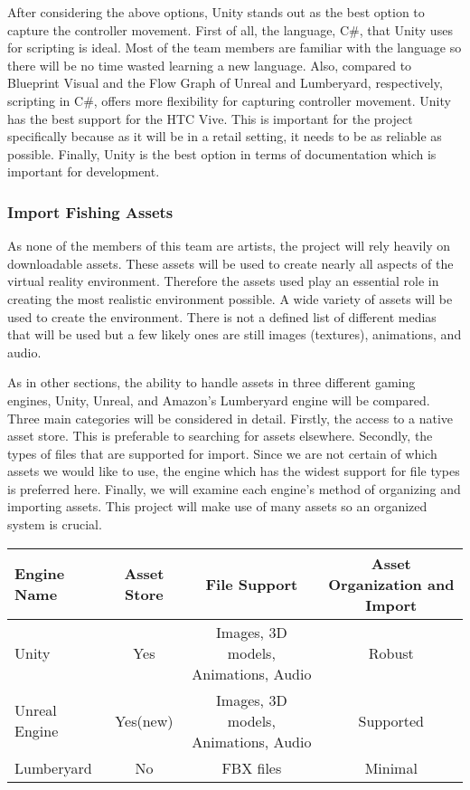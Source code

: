 \documentclass[10pt,journal,compsoc,onecolumn, draftclsnofoot]{IEEEtran}
\begin{document}
After considering the above options, Unity stands out as the best option to capture the controller movement.
First of all, the language, C\#, that Unity uses for scripting is ideal.
Most of the team members are familiar with the language so there will be no time wasted learning a new language.
Also, compared to Blueprint Visual and the Flow Graph of Unreal and Lumberyard, respectively, scripting in C\#, offers more flexibility for capturing controller movement.
Unity has the best support for the HTC Vive.
This is important for the project specifically because as it will be in a retail setting, it needs to be as reliable as possible.
Finally, Unity is the best option in terms of documentation which is important for development.

\subsubsection{Import Fishing Assets}
As none of the members of this team are artists, the project will rely heavily on downloadable assets.
These assets will be used to create nearly all aspects of the virtual reality environment.
Therefore the assets used play an essential role in creating the most realistic environment possible.
A wide variety of assets will be used to create the environment.
There is not a defined list of different medias that will be used but a few likely ones are still images (textures), animations, and audio.

As in other sections, the ability to handle assets in three different gaming engines, Unity, Unreal, and Amazon's Lumberyard engine will be compared.
Three main categories will be considered in detail.
Firstly, the access to a native asset store.
This is preferable to searching for assets elsewhere.
Secondly, the types of files that are supported for import.
Since we are not certain of which assets we would like to use, the engine which has the widest support for file types is preferred here.
Finally, we will examine each engine's method of organizing and importing assets.
This project will make use of many assets so an organized system is crucial.

\vspace{2mm}
\begin{table}[h!]
\centering
  \begin{tabular}{ | l || c | c | c | }
  \hline
  Engine Name & Asset Store & File Support & Asset Organization and Import\\
  \hline
  Unity & Yes & Images, 3D models, Animations, Audio & Robust\\ \hline
  Unreal Engine & Yes(new) & Images, 3D models, Animations, Audio & Supported\\ \hline
  Lumberyard & No & FBX files & Minimal\\ \hline
  \end{tabular}
\end{table}
\vspace{2mm}
\end{document}
